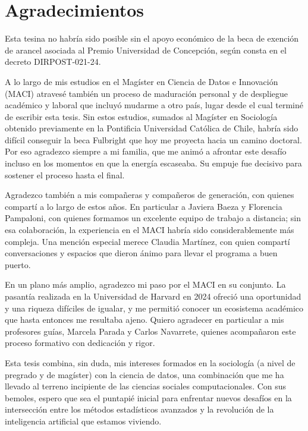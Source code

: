\documentclass[
  letterpaper,
  numbers=noendperiod,
  fontsize=11pt,
  DIV=12,
  titlepage=false]{scrreprt}
\begin{document}

\chapter*{Agradecimientos}\label{agradecimientos}


Esta tesina no habría sido posible sin el apoyo económico de la beca de
exención de arancel asociada al Premio Universidad de Concepción, según
consta en el decreto DIRPOST-021-24.

A lo largo de mis estudios en el Magíster en Ciencia de Datos e
Innovación (MACI) atravesé también un proceso de maduración personal y
de despliegue académico y laboral que incluyó mudarme a otro país, lugar
desde el cual terminé de escribir esta tesis. Sin estos estudios,
sumados al Magíster en Sociología obtenido previamente en la Pontificia
Universidad Católica de Chile, habría sido difícil conseguir la beca
Fulbright que hoy me proyecta hacia un camino doctoral. Por eso
agradezco siempre a mi familia, que me animó a afrontar este desafío
incluso en los momentos en que la energía escaseaba. Su empuje fue
decisivo para sostener el proceso hasta el final.

Agradezco también a mis compañeras y compañeros de generación, con
quienes compartí a lo largo de estos años. En particular a Javiera Baeza
y Florencia Pampaloni, con quienes formamos un excelente equipo de
trabajo a distancia; sin esa colaboración, la experiencia en el MACI
habría sido considerablemente más compleja. Una mención especial merece
Claudia Martínez, con quien compartí conversaciones y espacios que
dieron ánimo para llevar el programa a buen puerto.

En un plano más amplio, agradezco mi paso por el MACI en su conjunto. La
pasantía realizada en la Universidad de Harvard en 2024 ofreció una
oportunidad y una riqueza difíciles de igualar, y me permitió conocer un
ecosistema académico que hasta entonces me resultaba ajeno. Quiero
agradecer en particular a mis profesores guías, Marcela Parada y Carlos
Navarrete, quienes acompañaron este proceso formativo con dedicación y
rigor.

Esta tesis combina, sin duda, mis intereses formados en la sociología (a
nivel de pregrado y de magíster) con la ciencia de datos, una
combinación que me ha llevado al terreno incipiente de las ciencias
sociales computacionales. Con sus bemoles, espero que sea el puntapié
inicial para enfrentar nuevos desafíos en la intersección entre los
métodos estadísticos avanzados y la revolución de la inteligencia
artificial que estamos viviendo.
\end{document}
